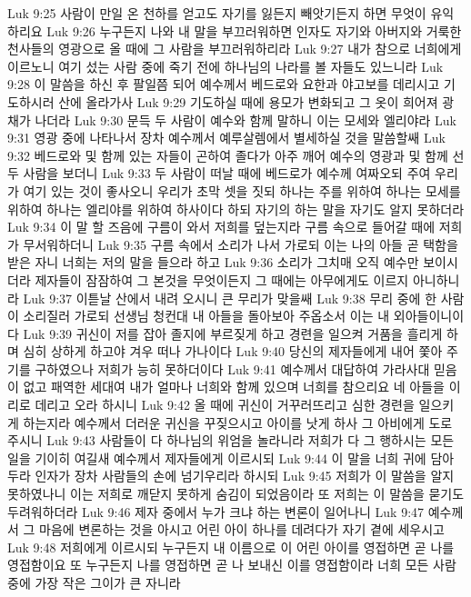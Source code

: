 Luk 9:25  사람이 만일 온 천하를 얻고도 자기를 잃든지 빼앗기든지 하면 무엇이 유익하리요
Luk 9:26  누구든지 나와 내 말을 부끄러워하면 인자도 자기와 아버지와 거룩한 천사들의 영광으로 올 때에 그 사람을 부끄러워하리라
Luk 9:27  내가 참으로 너희에게 이르노니 여기 섰는 사람 중에 죽기 전에 하나님의 나라를 볼 자들도 있느니라
Luk 9:28  이 말씀을 하신 후 팔일쯤 되어 예수께서 베드로와 요한과 야고보를 데리시고 기도하시러 산에 올라가사
Luk 9:29  기도하실 때에 용모가 변화되고 그 옷이 희어져 광채가 나더라
Luk 9:30  문득 두 사람이 예수와 함께 말하니 이는 모세와 엘리야라
Luk 9:31  영광 중에 나타나서 장차 예수께서 예루살렘에서 별세하실 것을 말씀할쌔
Luk 9:32  베드로와 및 함께 있는 자들이 곤하여 졸다가 아주 깨어 예수의 영광과 및 함께 선 두 사람을 보더니
Luk 9:33  두 사람이 떠날 때에 베드로가 예수께 여짜오되 주여 우리가 여기 있는 것이 좋사오니 우리가 초막 셋을 짓되 하나는 주를 위하여 하나는 모세를 위하여 하나는 엘리야를 위하여 하사이다 하되 자기의 하는 말을 자기도 알지 못하더라
Luk 9:34  이 말 할 즈음에 구름이 와서 저희를 덮는지라 구름 속으로 들어갈 때에 저희가 무서워하더니
Luk 9:35  구름 속에서 소리가 나서 가로되 이는 나의 아들 곧 택함을 받은 자니 너희는 저의 말을 들으라 하고
Luk 9:36  소리가 그치매 오직 예수만 보이시더라 제자들이 잠잠하여 그 본것을 무엇이든지 그 때에는 아무에게도 이르지 아니하니라
Luk 9:37  이튿날 산에서 내려 오시니 큰 무리가 맞을쌔
Luk 9:38  무리 중에 한 사람이 소리질러 가로되 선생님 청컨대 내 아들을 돌아보아 주옵소서 이는 내 외아들이니이다
Luk 9:39  귀신이 저를 잡아 졸지에 부르짖게 하고 경련을 일으켜 거품을 흘리게 하며 심히 상하게 하고야 겨우 떠나 가나이다
Luk 9:40  당신의 제자들에게 내어 쫓아 주기를 구하였으나 저희가 능히 못하더이다
Luk 9:41  예수께서 대답하여 가라사대 믿음이 없고 패역한 세대여 내가 얼마나 너희와 함께 있으며 너희를 참으리요 네 아들을 이리로 데리고 오라 하시니
Luk 9:42  올 때에 귀신이 거꾸러뜨리고 심한 경련을 일으키게 하는지라 예수께서 더러운 귀신을 꾸짖으시고 아이를 낫게 하사 그 아비에게 도로 주시니
Luk 9:43  사람들이 다 하나님의 위엄을 놀라니라 저희가 다 그 행하시는 모든 일을 기이히 여길새 예수께서 제자들에게 이르시되
Luk 9:44  이 말을 너희 귀에 담아 두라 인자가 장차 사람들의 손에 넘기우리라 하시되
Luk 9:45  저희가 이 말씀을 알지 못하였나니 이는 저희로 깨닫지 못하게 숨김이 되었음이라 또 저희는 이 말씀을 묻기도 두려워하더라
Luk 9:46  제자 중에서 누가 크냐 하는 변론이 일어나니
Luk 9:47  예수께서 그 마음에 변론하는 것을 아시고 어린 아이 하나를 데려다가 자기 곁에 세우시고
Luk 9:48  저희에게 이르시되 누구든지 내 이름으로 이 어린 아이를 영접하면 곧 나를 영접함이요 또 누구든지 나를 영접하면 곧 나 보내신 이를 영접함이라 너희 모든 사람 중에 가장 작은 그이가 큰 자니라
